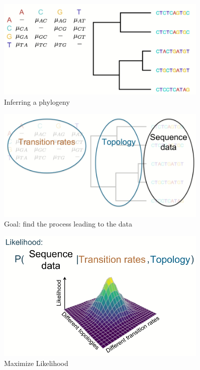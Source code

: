 \documentclass[]{article}
\begin{document}
\begin{figure}[H]
	\caption{Inferring a phylogeny}\label{fig:InferringPhylogeny}
	\includegraphics[width=0.9\textwidth]{InferringPhylogeny}
\end{figure}

\begin{figure}[H]
	\caption{Goal: find the process leading to the data}\label{fig:InferringPhylogeny1}
	\includegraphics[width=0.9\textwidth]{InferringPhylogeny1}
\end{figure}

\begin{figure}[H]
	\caption{Maximize Likelihood}\label{fig:InferringPhylogeny2}
	\includegraphics[width=0.9\textwidth]{InferringPhylogeny2}
\end{figure}
\end{document}
